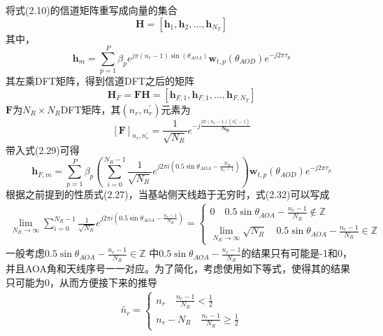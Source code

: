 \documentclass[bachelor,nocolorlinks, printoneside]{seuthesis} %
\begin{document}
\begin{Main}
将式(2.10)的信道矩阵重写成向量的集合
\begin{equation}\label{key}
\mathbf{H} = [\mathbf{h}_1,\mathbf{h}_2,...,\mathbf{h}_{N_T}]
\end{equation}
其中，
\begin{equation}\label{key}
\mathbf{h}_m = \sum_{p=1}^{P}\beta_p e^{j\pi (n_r-1) \sin(\theta_{AOA})} \mathbf{w}_{t,p}(\theta_{AOD}) e^{-j2\pi\tau_{p}}
\end{equation}
其左乘DFT矩阵，得到信道DFT之后的矩阵
\begin{equation}\label{key}
\mathbf{H}_{F} = \mathbf{F} \mathbf{H} =[\mathbf{h}_{F,1},\mathbf{h}_{F,1},...,\mathbf{h}_{F,N_T}]
\end{equation}
$\mathbf{F}$为$N_R \times N_R $DFT矩阵，其$(n_r,n_r^{'})$元素为
\begin{equation}\label{key}
[ \mathbf{F} ]_{n_r,n_r^{'}} = \frac{1}{\sqrt{N_R}} e^{-j \frac{2\pi (n_r-1)(n_r^{*}-1)}{\mathbf{N_R}}}
\end{equation}
带入式(2.29)可得
\begin{equation}\label{key}
\mathbf{h}_{F,m} = \sum_{p=1}^{P} \beta_p \left( \sum_{i=0}^{N_R-1} \frac{1}{\sqrt{N_R}} e^{j2\pi i(0.5\sin \theta_{AOA} - \frac{N_R}{n_r-1})} \right) \mathbf{w}_{t,p}(\theta_{AOD}) e^{-j2\pi\tau_{p}}
\end{equation}
根据之前提到的性质式(2.27)，当基站侧天线趋于无穷时，式(2.32)可以写成
\begin{eqnarray}\label{key}
\lim_{N_R \rightarrow \infty} \sum_{i=0}^{N_R-1} \frac{1}{\sqrt{N_R}} e^{j2\pi i(0.5 \sin \theta_{AOA} -\frac{n_r-1}{N_R})} = \left \lbrace
\begin{array}{l}
0 \quad 0.5\sin \theta_{AOA} - \frac{n_r-1}{N_R} \notin \mathbb{Z} \\
\lim_{N_R \rightarrow \infty} \sqrt{N_R}  \quad 0.5\sin \theta_{AOA} - \frac{n_r-1}{N_R} \in \mathbb{Z} 
\end{array}
\right.
\end{eqnarray}
一般考虑$ 0.5\sin \theta_{AOA} - \frac{n_r-1}{N_R} \in \mathbb{Z}$ 中$0.5\sin \theta_{AOA} - \frac{n_r-1}{N_R} $的结果只有可能是-1和0，并且AOA角和天线序号一一对应。为了简化，考虑使用如下等式，使得其的结果只可能为0，从而方便接下来的推导
\begin{eqnarray}\label{key}
\tilde{n_r} = \left \lbrace
\begin{array}{l}
n_r \quad \frac{n_r-1}{N_R} < \frac{1}{2}\\
n_r - N_R \quad \frac{n_r-1}{N_R} \geq \frac{1}{2}
\end{array}

\end{eqnarray}
\end{Main}
\end{document}
